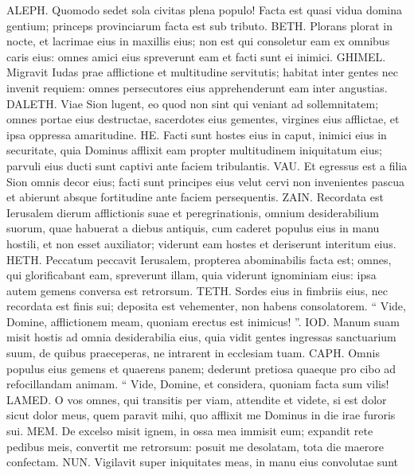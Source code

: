 \begin{biblechapter}
 \verse ALEPH. Quomodo sedet sola
 civitas plena populo!
 Facta est quasi vidua
 domina gentium;
 princeps provinciarum
 facta est sub tributo.
 \verse BETH. Plorans plorat in nocte,
 et lacrimae eius in maxillis eius;
 non est qui consoletur eam
 ex omnibus caris eius:
 omnes amici eius spreverunt eam
 et facti sunt ei inimici.
 \verse GHIMEL. Migravit Iudas prae afflictione
 et multitudine servitutis;
 habitat inter gentes
 nec invenit requiem:
 omnes persecutores eius apprehenderunt eam
 inter angustias.
 \verse DALETH. Viae Sion lugent,
 eo quod non sint qui veniant ad sollemnitatem;
 omnes portae eius destructae,
 sacerdotes eius gementes,
 virgines eius afflictae,
 et ipsa oppressa amaritudine.
 \verse HE. Facti sunt hostes eius in caput,
 inimici eius in securitate,
 quia Dominus afflixit eam
 propter multitudinem iniquitatum eius;
 parvuli eius ducti sunt captivi
 ante faciem tribulantis.
 \verse VAU. Et egressus est a filia Sion
 omnis decor eius;
 facti sunt principes eius velut cervi
 non invenientes pascua
 et abierunt absque fortitudine
 ante faciem persequentis.
 \verse ZAIN. Recordata est Ierusalem
 dierum afflictionis suae et peregrinationis,
 omnium desiderabilium suorum,
 quae habuerat a diebus antiquis,
 cum caderet populus eius in manu hostili,
 et non esset auxiliator;
 viderunt eam hostes
 et deriserunt interitum eius.
 \verse HETH. Peccatum peccavit Ierusalem,
 propterea abominabilis facta est;
 omnes, qui glorificabant eam, spreverunt illam,
 quia viderunt ignominiam eius:
 ipsa autem gemens
 conversa est retrorsum.
 \verse TETH. Sordes eius in fimbriis eius,
 nec recordata est finis sui;
 deposita est vehementer,
 non habens consolatorem.
 “ Vide, Domine, afflictionem meam, quoniam erectus est inimicus! ”.
 \verse IOD. Manum suam misit hostis
 ad omnia desiderabilia eius,
 quia vidit gentes
 ingressas sanctuarium suum,
 de quibus praeceperas,
 ne intrarent in ecclesiam tuam.
 \verse CAPH. Omnis populus eius gemens
 et quaerens panem;
 dederunt pretiosa quaeque pro cibo
 ad refocillandam animam.
 “ Vide, Domine, et considera,
 quoniam facta sum vilis!
 \verse LAMED. O vos omnes, qui transitis per viam,
 attendite et videte,
 si est dolor sicut dolor meus,
 quem paravit mihi,
 quo afflixit me Dominus
 in die irae furoris sui.
 \verse MEM. De excelso misit ignem,
 in ossa mea immisit eum;
 expandit rete pedibus meis,
 convertit me retrorsum:
 posuit me desolatam,
 tota die maerore confectam.
 \verse NUN. Vigilavit super iniquitates meas,
 in manu eius convolutae sunt

\end{biblechapter}

